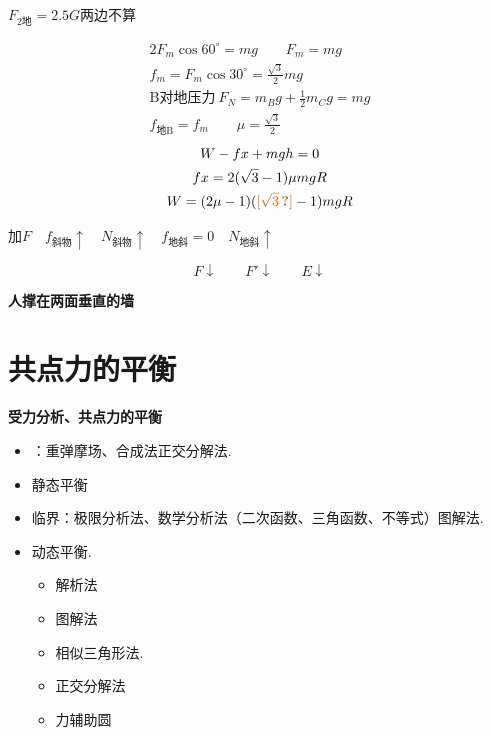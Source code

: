 $F_{2\text{地}}=2.5G$\quad 两边不算


\begin{gather*}
2F_m\cos60^\circ=mg\qquad F_m=mg\\
f_m=F_m\cos30^\circ=\frac{\sqrt{3}}{2}mg\\
\text{B对地压力}\ F_N=m_Bg+\tfrac12 m_Cg=mg\\
f_{\text{地B}}=f_m\qquad \mu=\frac{\sqrt{3}}{2}
\end{gather*}
\begin{gather*}
W-fx+mgh=0\\
fx=2(\sqrt{3}-1)\mu mgR\\
W=(2\mu-1)(\unclear{\sqrt{3}}-1)mgR
\end{gather*}


加$F$　$f_{\text{斜物}}\uparrow$　$N_{\text{斜物}}\uparrow$　$f_{\text{地斜}}=0$　$N_{\text{地斜}}\uparrow$

\begin{problem}
\begin{solution}
\[ F\downarrow\qquad F'\downarrow\qquad E\downarrow \] %
\end{solution}
\end{problem}

\textbf{人撑在两面垂直的墙}


\section{共点力的平衡}
\textbf{受力分析、共点力的平衡}
\begin{itemize}
\item {}：重弹摩场、合成法\quad 正交分解法.
\item 静态平衡
\item 临界：极限分析法、数学分析法（二次函数、三角函数、不等式）\quad 图解法.
\item 动态平衡.
  \begin{itemize}
  \item 解析法
  \item 图解法
  \item 相似三角形法.
  \item 正交分解法
  \item 力辅助圆 %
  \end{itemize}
\end{itemize}

